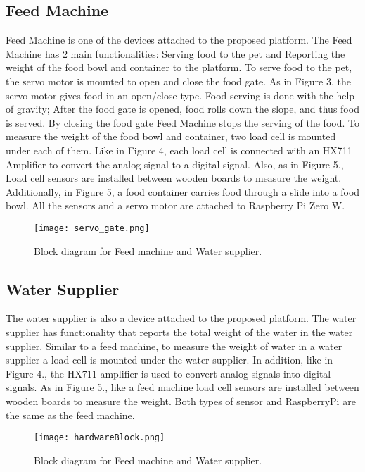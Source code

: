 \documentclass[conference]{IEEEtran}
\begin{document}
\subsection{Feed Machine}
Feed Machine is one of the devices attached to the proposed platform. The Feed Machine has 2 main functionalities: Serving food to the pet and Reporting the weight of the food bowl and container to the platform. To serve food to the pet, the servo motor is mounted to open and close the food gate. As in Figure 3, the servo motor gives food in an open/close type. Food serving is done with the help of gravity; After the food gate is opened, food rolls down the slope, and thus food is served. By closing the food gate Feed Machine stops the serving of the food. To measure the weight of the food bowl and container, two load cell is mounted under each of them. Like in Figure 4, each load cell is connected with an HX711 Amplifier to convert the analog signal to a digital signal. Also, as in Figure 5., Load cell sensors are installed between wooden boards to measure the weight. Additionally, in Figure 5, a food container carries food through a slide into a food bowl. All the sensors and a servo motor are attached to Raspberry Pi Zero W.

\begin{figure}[htbp]
\centerline{\texttt{[image: servo\_gate.png]}}
\caption{Block diagram for Feed machine and Water supplier.}
\label{fig}
\end{figure}

\subsection{Water Supplier}
The water supplier is also a device attached to the proposed platform.
The water supplier has functionality that reports the total weight of the water in the water supplier.
Similar to a feed machine, to measure the weight of water in a water supplier a load cell is mounted under the water supplier. In addition, like in Figure 4., the HX711 amplifier is used to convert analog signals into digital signals. As in Figure 5., like a feed machine load cell sensors are installed between wooden boards to measure the weight. Both types of sensor and RaspberryPi are the same as the feed machine. 

\begin{figure}[htbp]
\centerline{\texttt{[image: hardwareBlock.png]}}
\caption{Block diagram for Feed machine and Water supplier.}
\label{fig}
\end{figure}
\end{document}
